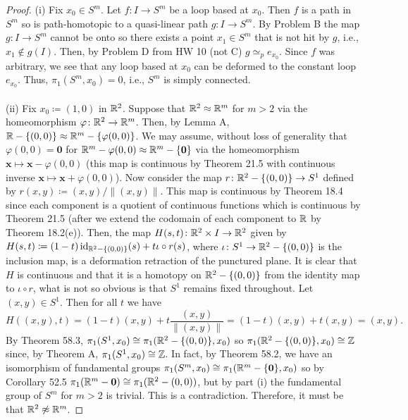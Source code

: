 \begin{proof}
(i) Fix $x_0\in S^m$. Let $f\colon I\to S^m$ be a loop based at $x_0$. Then
$f$ is a path in $S^m$ so is path-homotopic to a quasi-linear path $g\colon
I\to S^m$. By Problem B the map $g\colon I\to S^m$ cannot be onto so there
exists a point $x_1\in S^m$ that is not hit by $g$, i.e., $x_1\notin
g(I)$. Then, by Problem D from HW 10 (not C) $g\simeq_p e_{x_0}$. Since $f$
was arbitrary, we see that any loop based at $x_0$ can be deformed to the
constant loop $e_{x_0}$. Thus, $\pi_1(S^m,x_0)=0$, i.e., $S^m$ is simply
connected.
\\\\
(ii) Fix $x_0\coloneqq(1,0)$ in $\mathbb{R}^2$. Suppose that $\mathbb{R}^2\approx\mathbb{R}^m$
for $m>2$ via the homeomorphism $\varphi\colon\mathbb{R}^2\to\mathbb{R}^m$. Then, by
Lemma A, $\mathbb{R}-\{(0,0)\}\approx\mathbb{R}^m-\{\varphi(0,0)\}$. We may assume,
without loss of generality that $\varphi(0,0)=\mathbf{0}$ for
$\mathbb{R}^m-{\varphi(0,0)}\approx\mathbb{R}^m-\{\mathbf{0}\}$ via the homeomorphism
$\mathbf{x}\mapsto\mathbf{x}-\varphi(0,0)$ (this map is continuous by
Theorem 21.5 with continuous inverse
$\mathbf{x}\mapsto\mathbf{x}+\varphi(0,0)$). Now consider the map
$r\colon\mathbb{R}^2-\{(0,0)\}\to S^1$ defined by $r(x,y)\coloneqq
(x,y)/\|(x,y)\|$. This map is continuous by Theorem 18.4 since each
component is a quotient of continuous functions which is continuous by
Theorem 21.5 (after we extend the codomain of each component to $\mathbb{R}$ by
Theorem 18.2(e)). Then, the map $H(s,t)\colon \mathbb{R}^2\times I\to\mathbb{R}^2$ given
by $H(s,t)\coloneqq (1-t)\operatorname{id}_{\mathbb{R}^2-\{(0,0)\}}(s)+t \iota\circ r(s)$, where
$\iota\colon S^1\to\mathbb{R}^2-\{(0,0)\}$ is the inclusion map, is a deformation
retraction of the punctured plane. It is clear that $H$ is continuous and
that it is a homotopy on $\mathbb{R}^2-\{(0,0)\}$ from the identity map to
$\iota\circ r$, what is not so obvious is that $S^1$ remains fixed
throughout. Let $(x,y)\in S^1$. Then for all $t$ we have
\[
H((x,y),t)=(1-t)(x,y)+t\frac{(x,y)}{\|(x,y)\|}=(1-t)(x,y)+t(x,y)=(x,y).
\]
By Theorem 58.3, $\pi_1(S^1,x_0)\cong\pi_1(\mathbb{R}^2-\{(0,0)\},x_0)$ so
$\pi_1(\mathbb{R}^2-\{(0,0)\},x_0)\cong\mathbb{Z}$ since, by Theorem A,
$\pi_1(S^1,x_0)\cong\mathbb{Z}$. In fact, by Theorem 58.2, we have an isomorphism
of fundamental groups $\pi_1(S^m,x_0)\cong\pi_1(\mathbb{R}^m-\{\mathbf{0}\},x_0)$
so by Corollary 52.5 $\pi_1(\mathbb{R}^m-{\mathbf{0}})\cong\pi_1(\mathbb{R}^2-{(0,0)})$,
but by part (i) the fundamental group of $S^m$ for $m>2$ is trivial. This
is a contradiction. Therefore, it must be that $\mathbb{R}^2\not\approx\mathbb{R}^m$.
\end{proof}

